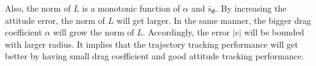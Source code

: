 \documentclass[letterpaper, 10 pt, conference]{ieeeconf}  %
\begin{document}
Also, the norm of $L$ is a monotonic function of $\alpha$ and $\bar{\text{s}}_\Phi$. 
By increasing the attitude error, the norm of $L$ will get larger. 
In the same manner, the bigger drag coefficient $\alpha$ will grow the norm of $L$.
Accordingly, the error $|e|$ will be bounded with larger radius. 
It implies that the trajectory tracking performance will get better by having small drag coefficient and good attitude tracking performance.
\end{document}
